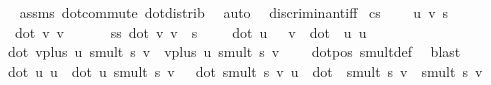 \begin{isabellebody}
%
\isadelimproof
\ \ %
\endisadelimproof
%
\isatagproof
{}\isamarkupfalse%
\ assms{\isacharparenleft}{\kern0pt}{}{\isacharcomma}{\kern0pt}{}{\isacharparenright}{\kern0pt}\ dot{\isacharunderscore}{\kern0pt}commute\ dot{\isacharunderscore}{\kern0pt}distrib\ \isamarkupfalse%
\ auto%
\endisatagproof
{\isafoldproof}%
%
\isadelimproof
\isanewline
%
\endisadelimproof
\isanewline
\isanewline
\isanewline
{}\isamarkupfalse%
\ \ discriminant{\isacharunderscore}{\kern0pt}iff\isanewline
\isanewline
{}\isamarkupfalse%
\ cs{}{\isacharcolon}{\kern0pt}\ \isanewline
\ \ \ u\ v\ s\isanewline
\ \ \ {\isachardoublequoteopen}{\isacharparenleft}{\kern0pt}dot\ v\ v{\isacharparenright}{\kern0pt}\ \ {\isasymnoteq}\ {}{\isachardoublequoteclose}\isanewline
\ \ \ {\isachardoublequoteopen}s{\isacharasterisk}{\kern0pt}s{\isacharasterisk}{\kern0pt}\ dot\ v\ v\ {\isacharplus}{\kern0pt}\ s\ {\isacharasterisk}{\kern0pt}\ {}\ {\isacharasterisk}{\kern0pt}\ \ {\isacharparenleft}{\kern0pt}dot\ u\ \ \ v{\isacharparenright}{\kern0pt}\ {\isacharplus}{\kern0pt}\ {\isacharparenleft}{\kern0pt}dot\ \ u\ u{\isacharparenright}{\kern0pt}\ {\isasymge}\ {}{\isachardoublequoteclose}\isanewline
%
\isadelimproof
%
\endisadelimproof
%
\isatagproof
{}\isamarkupfalse%
\ {\isacharminus}{\kern0pt}\ \isanewline
\ \ \isamarkupfalse%
\ {}{\isacharcolon}{\kern0pt}\ {\isachardoublequoteopen}dot\ {\isacharparenleft}{\kern0pt}vplus\ u\ {\isacharparenleft}{\kern0pt}smult\ s\ v{\isacharparenright}{\kern0pt}{\isacharparenright}{\kern0pt}\ \ {\isacharparenleft}{\kern0pt}vplus\ u\ {\isacharparenleft}{\kern0pt}smult\ s\ v{\isacharparenright}{\kern0pt}{\isacharparenright}{\kern0pt}\ {\isasymge}\ {}{\isachardoublequoteclose}\ \isamarkupfalse%
\ dot{\isacharunderscore}{\kern0pt}pos\ smult{\isacharunderscore}{\kern0pt}def\ \isamarkupfalse%
\ blast\isanewline
\ \ \isamarkupfalse%
\ {}{\isacharcolon}{\kern0pt}\ {\isachardoublequoteopen}dot\ u\ u\ {\isacharplus}{\kern0pt}\ dot\ u\ {\isacharparenleft}{\kern0pt}smult\ s\ v{\isacharparenright}{\kern0pt}\ \ {\isacharplus}{\kern0pt}\ dot\ {\isacharparenleft}{\kern0pt}smult\ s\ v{\isacharparenright}{\kern0pt}\ u\ {\isacharplus}{\kern0pt}\ dot\ \ {\isacharparenleft}{\kern0pt}smult\ s\ v{\isacharparenright}{\kern0pt}\ \ {\isacharparenleft}{\kern0pt}smult\ s\ v{\isacharparenright}{\kern0pt}\ {\isasymge}\ {}{\isachardoublequoteclose}\ \ \isanewline

\end{isabellebody}
